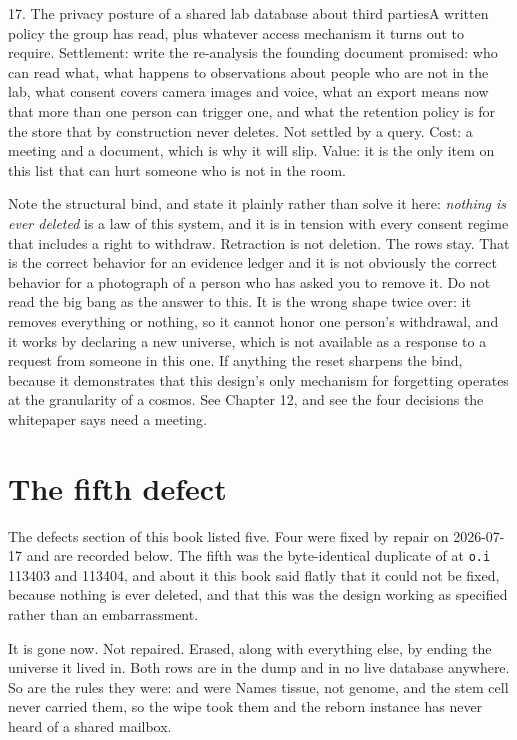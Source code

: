 \begin{Open}{17. The privacy posture of a shared lab database about third parties}{A written policy the group has read, plus whatever access mechanism it turns out to require.}
Settlement: write the re-analysis the founding document promised: who can read what, what happens to observations about people who are not in the lab, what consent covers camera images and voice, what an export means now that more than one person can trigger one, and what the retention policy is for the store that by construction never deletes. Not settled by a query. Cost: a meeting and a document, which is why it will slip. Value: it is the only item on this list that can hurt someone who is not in the room.

Note the structural bind, and state it plainly rather than solve it here: \textit{nothing is ever deleted} is a law of this system, and it is in tension with every consent regime that includes a right to withdraw. Retraction is not deletion. The rows stay. That is the correct behavior for an evidence ledger and it is not obviously the correct behavior for a photograph of a person who has asked you to remove it. Do not read the big bang as the answer to this. It is the wrong shape twice over: it removes everything or nothing, so it cannot honor one person's withdrawal, and it works by declaring a new universe, which is not available as a response to a request from someone in this one. If anything the reset sharpens the bind, because it demonstrates that this design's only mechanism for forgetting operates at the granularity of a cosmos. See Chapter 12, and see the four decisions the whitepaper says need a meeting.
\end{Open}

\section{The fifth defect}

The defects section of this book listed five. Four were fixed by repair on 2026-07-17 and are recorded below. The fifth was the byte-identical duplicate of  at \texttt{o.i} 113403 and 113404, and about it this book said flatly that it could not be fixed, because nothing is ever deleted, and that this was the design working as specified rather than an embarrassment.

It is gone now. Not repaired. Erased, along with everything else, by ending the universe it lived in. Both rows are in the dump and in no live database anywhere. So are the rules they were:  and  were Names tissue, not genome, and the stem cell never carried them, so the wipe took them and the reborn instance has never heard of a shared mailbox.

